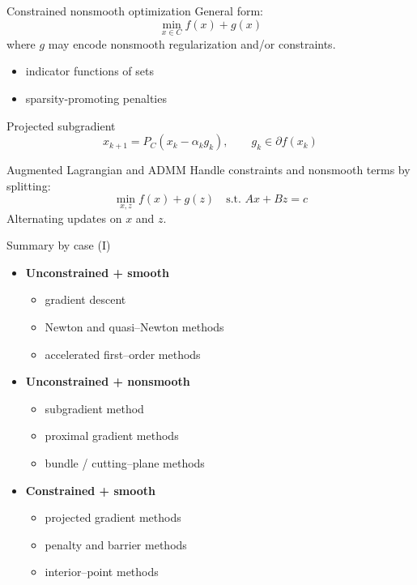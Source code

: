 \documentclass[aspectratio=169]{beamer}
\begin{document}
\begin{frame}{Constrained nonsmooth optimization}
General form:
\[
\min_{x\in C} f(x) + g(x)
\]
where $g$ may encode nonsmooth regularization and/or constraints.
\pause
\begin{itemize}
    \item indicator functions of sets
    \item sparsity-promoting penalties
\end{itemize}

\begin{block}{Projected subgradient}
\[
x_{k+1}
=
P_C\left(x_k-\alpha_k g_k\right),
\qquad g_k\in \partial f(x_k)
\]
\end{block}
\pause
\begin{block}{Augmented Lagrangian and ADMM}
Handle constraints and nonsmooth terms by splitting:
\[
\min_{x,z} f(x)+g(z)
\quad \text{s.t. } Ax+Bz=c
\]
Alternating updates on $x$ and $z$.
\end{block}
\end{frame}


\begin{frame}{Summary by case (I)}

\begin{itemize}

    \item \textbf{Unconstrained + smooth}  
    \begin{itemize}
        \item gradient descent
        \item Newton and quasi–Newton methods
        \item accelerated first–order methods
    \end{itemize}

    \item \textbf{Unconstrained + nonsmooth}  
    \begin{itemize}
        \item subgradient method
        \item proximal gradient methods
        \item bundle / cutting–plane methods
    \end{itemize}

    \item \textbf{Constrained + smooth}  
    \begin{itemize}
        \item projected gradient methods
        \item penalty and barrier methods
        \item interior–point methods
    \end{itemize}

\end{itemize}

\end{frame}
\end{document}
